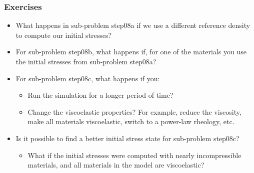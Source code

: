 \subsubsection{Exercises}

\begin{itemize}
\item What happens in sub-problem step08a if we use a different
  reference density to compute our initial stresses?
\item For sub-problem step08b, what happens if, for one of the
  materials you use the initial stresses from sub-problem step08a?
\item For sub-problem step08c, what happens if you:
  \begin{itemize}
  \item Run the simulation for a longer period of time?
  \item Change the viscoelastic properties? For example, reduce the
    viscosity, make all materials viscoelastic, switch to a power-law
    rheology, etc.
  \end{itemize}
\item Is it possible to find a better initial stress state for
  sub-problem step08c?
  \begin{itemize}
  \item What if the initial stresses were computed with nearly
    incompressible materials, and all materials in the model are
    viscoelastic?
  \end{itemize}
\end{itemize}

